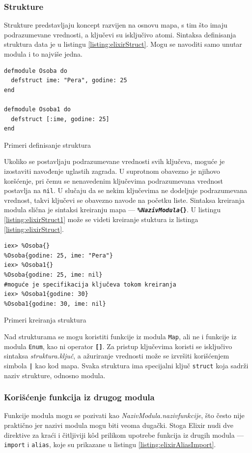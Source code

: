 \documentclass[12pt,oneside]{memoir}
\begin{document}
\subsubsection{Strukture}
Strukture predstavljaju koncept razvijen na osnovu mapa, s tim što imaju podrazumevane 
vrednosti, a ključevi su isključivo atomi. Sintaksa definisanja struktura data je u listingu
\ref{listing:elixirStruct}. Mogu se navoditi samo unutar modula i to najviše jedna.
\begin{listing}[!h]
\begin{verbatim}
defmodule Osoba do
  defstruct ime: "Pera", godine: 25
end

defmodule Osoba1 do
  defstruct [:ime, godine: 25]
end
\end{verbatim}
\caption{Primeri definisanje struktura}
\label{listing:elixirStruct}
\end{listing}

Ukoliko se postavljaju podrazumevane vrednosti svih ključeva, moguće je izostaviti navođenje
uglastih zagrada. U suprotnom obavezno je njihovo koršćenje, pri čemu se nenavedenim ključevima
podrazumevana vrednost postavlja na \texttt{nil}. U slučaju da se nekim ključevima ne dodeljuje
podrazumevana vrednost, takvi ključevi se obavezno navode na početku liste. Sintaksa kreiranja
modula slična je sintaksi kreiranju mapa --- \texttt{\textbf{\%\emph{NazivModula}\{\}}}. U 
listingu \ref{listing:elixirStruct1} može se videti kreiranje stuktura iz listinga
\ref{listing:elixirStruct}.
\begin{listing}[!h]
\begin{verbatim}
iex> %Osoba{}
%Osoba{godine: 25, ime: "Pera"}
iex> %Osoba1{}
%Osoba{godine: 25, ime: nil}
#moguće je specifikacija ključeva tokom kreiranja
iex> %Osoba1{godine: 30}
%Osoba1{godine: 30, ime: nil}
\end{verbatim}
\caption{Primeri kreiranja struktura}
\label{listing:elixirStruct1}
\end{listing}

Nad strukturama se mogu koristiti funkcije iz modula \texttt{Map}, ali ne i funkcije iz
modula \texttt{Enum}, kao ni operator \texttt{\textbf{[\smallskip]}}. Za pristup ključevima
koristi se isključivo sintaksa \emph{struktura.ključ}, a ažuriranje vrednosti može se izvršiti
korišćenjem simbola \texttt{\textbf{|}} kao kod mapa. Svaka struktura ima specijalni ključ 
\texttt{\textunderscore\textunderscore{}struct\textunderscore\textunderscore} koja sadrži 
naziv strukture, odnosno modula. 

\subsubsection{Korišćenje funkcija iz drugog modula}
Funkcije modula mogu se pozivati kao \emph{NazivModula.naziv\textunderscore{}funkcije},
što često nije praktično jer nazivi modula
mogu biti veoma dugački. Stoga Elixir nudi dve direktive za kraći i čitljiviji k\^{o}d prilikom
upotrebe funkcija iz drugih modula --- \texttt{import} i \texttt{alias}, koje su prikazane u
listingu \ref{listing:elixirAliasImport}.
\end{document}
